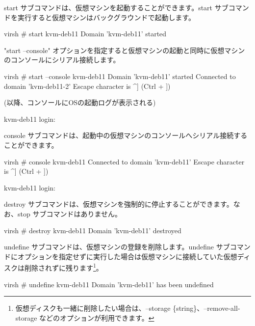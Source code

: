 \documentclass[mingoth,a4paper]{jsarticle}
\begin{document}

start サブコマンドは、仮想マシンを起動することができます。start サブコマンドを実行すると仮想マシンはバックグラウンドで起動します。

\begin{commandline}
virsh # start kvm-deb11
Domain 'kvm-deb11' started
\end{commandline}

"start --console" オプションを指定すると仮想マシンの起動と同時に仮想マシンのコンソールにシリアル接続します。

\begin{commandline}
virsh # start --console kvm-deb11
Domain 'kvm-deb11' started
Connected to domain 'kvm-deb11-2'
Escape character is ^] (Ctrl + ])

 (以降、コンソールにOSの起動ログが表示される)

kvm-deb11 login:  
\end{commandline}



console サブコマンドは、起動中の仮想マシンのコンソールへシリアル接続することができます。

\begin{commandline}
virsh # console kvm-deb11
Connected to domain 'kvm-deb11'
Escape character is ^] (Ctrl + ])

kvm-deb11 login:
\end{commandline}



destroy サブコマンドは、仮想マシンを強制的に停止することができます。なお、stop サブコマンドはありません。

\begin{commandline}
virsh # destroy kvm-deb11
Domain 'kvm-deb11' destroyed
\end{commandline}



undefine サブコマンドは、仮想マシンの登録を削除します。undefine サブコマンドにオプションを指定せずに実行した場合は仮想マシンに接続していた仮想ディスクは削除されずに残ります\footnote{仮想ディスクも一緒に削除したい場合は、--storage \{string\}、--remove-all-storage などのオプションが利用できます。}。

\begin{commandline}
virsh # undefine kvm-deb11
Domain 'kvm-deb11' has been undefined
\end{commandline}
\end{document}
